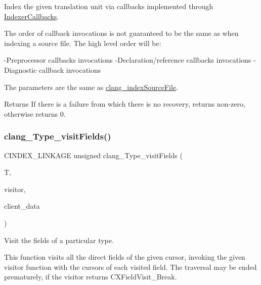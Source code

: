 Index the given translation unit via callbacks implemented through \hyperlink{structIndexerCallbacks}{Indexer\+Callbacks}. 

The order of callback invocations is not guaranteed to be the same as when indexing a source file. The high level order will be\+:

-\/\+Preprocessor callbacks invocations -\/\+Declaration/reference callbacks invocations -\/\+Diagnostic callback invocations

The parameters are the same as \hyperlink{group__CINDEX__HIGH_gaa5c2ad8979779c401b91110d444e2be6}{clang\+\_\+index\+Source\+File}.

\begin{DoxyReturn}{Returns}
If there is a failure from which there is no recovery, returns non-\/zero, otherwise returns 0. 
\end{DoxyReturn}
\mbox{\label{group__CINDEX__HIGH_ga18285a2cefecf5a069c64e675b627273}} 
\subsubsection{\texorpdfstring{clang\+\_\+\+Type\+\_\+visit\+Fields()}{clang\_Type\_visitFields()}}
{\footnotesize\ttfamily C\+I\+N\+D\+E\+X\+\_\+\+L\+I\+N\+K\+A\+GE unsigned clang\+\_\+\+Type\+\_\+visit\+Fields (\begin{DoxyParamCaption}\item[{\hyperlink{structCXType}{C\+X\+Type}}]{T,  }\item[{\hyperlink{group__CINDEX__HIGH_ga5040863c91d7a720a97569cf869f42a4}{C\+X\+Field\+Visitor}}]{visitor,  }\item[{\hyperlink{group__CINDEX_gacfa40c3de26d228c0d898403c2c21612}{C\+X\+Client\+Data}}]{client\+\_\+data }\end{DoxyParamCaption})}



Visit the fields of a particular type. 

This function visits all the direct fields of the given cursor, invoking the given {\ttfamily visitor} function with the cursors of each visited field. The traversal may be ended prematurely, if the visitor returns {\ttfamily C\+X\+Field\+Visit\+\_\+\+Break}.


